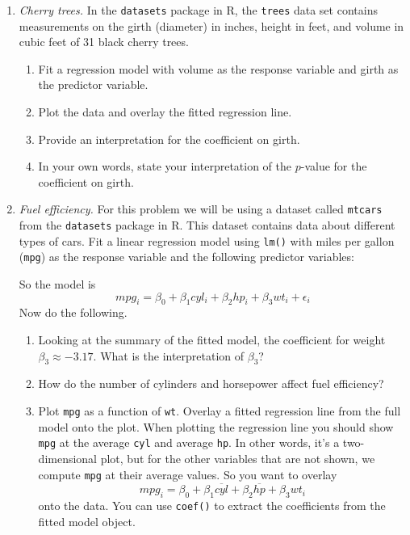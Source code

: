 \begin{enumerate}
\item \emph{Cherry trees.} In the \texttt{datasets} package in R, the
  \texttt{trees} data set contains measurements on the girth
  (diameter) in inches, height in feet, and volume in cubic feet of 31
  black cherry trees.
\begin{enumerate}
\item Fit a regression model with volume as the response
variable and girth as the predictor variable.
\item Plot the data and overlay the fitted regression line.
\item Provide an interpretation for the coefficient on girth.
\item In your own words, state your interpretation of the $p$-value
for the coefficient on girth.
\end{enumerate}
  
\item \emph{Fuel efficiency.}
  For this problem we will be using a dataset called \texttt{mtcars}
  from the \texttt{datasets} package in R. This dataset contains data
  about different types of cars.  Fit a linear regression model using
  \texttt{lm()} with miles per gallon (\texttt{mpg}) as the response
  variable and the following predictor variables:
    So the model is
    \[ mpg_i = \beta_0 + \beta_1 cyl_i + \beta_2 hp_i +
      \beta_3 wt_i + \epsilon_i \]
    Now do the following.
    \begin{enumerate}
    \item Looking at the summary of the fitted model, the coefficient for weight 
      $\beta_3 \approx -3.17$. What is the interpretation of $\beta_3$?
      
    \item How do the number of cylinders and horsepower affect fuel
      efficiency?
     
    \item Plot \texttt{mpg} as a function of
    \texttt{wt}. Overlay a fitted regression line from the
    full model onto the plot.  When plotting the regression line you
    should show \texttt{mpg} at the average \texttt{cyl} and average \texttt{hp}.
    In other words, it's a two-dimensional plot, but for the other
    variables that are not shown, we compute \texttt{mpg} at their
    average values. So you want to overlay
    \[ mpg_i = \beta_0 + \beta_1 \overline{cyl} +
      \beta_2 \overline{hp} +
      \beta_3 wt_i \]
    onto the data. You can use \texttt{coef()} to extract the
    coefficients from the fitted model object.


\end{enumerate}
\end{enumerate}

